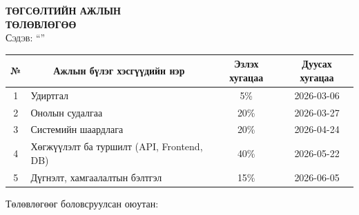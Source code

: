 
\begin{titlepage}
  \vspace*{0.5cm}
  \begin{center}
  \vspace*{2cm}
  \textbf{{\large ТӨГСӨЛТИЙН АЖЛЫН \\ ТӨЛӨВЛӨГӨӨ}}\\[0.5cm]
  
  \textsc{\large Сэдэв: ``\ttitle''}\\[0.5cm]
  
  \begin{tabular}{|c|p{7cm}|c|c|}
  \hline
  № & \multicolumn{1}{c|}{Ажлын бүлэг хэсгүүдийн нэр} & Эзлэх хугацаа & Дуусах хугацаа \\ \hline
  1 & Удиртгал & 5\% & 2026-03-06 \\ \hline
  2 & Онолын судалгаа & 20\% & 2026-03-27 \\ \hline
  3 & Системийн шаардлага & 20\% & 2026-04-24 \\ \hline
  4 & Хөгжүүлэлт ба туршилт (API, Frontend, DB) & 40\% & 2026-05-22 \\ \hline
  5 & Дүгнэлт, хамгаалалтын бэлтгэл & 15\% & 2026-06-05 \\ \hline
  \end{tabular}
  
  \vspace{2cm}
  
  Төлөвлөгөөг боловсруулсан оюутан: \shortname
  
  \end{center}
\end{titlepage}


\newpage

